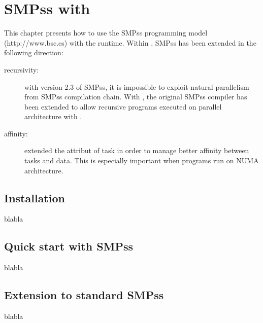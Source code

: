 \chapter{SMPss with \kaapi}
\label{chap:api_smpss}

This chapter presents how to use the SMPss programming model (http://www.bsc.es) with the \kaapi runtime. Within \kaapi, SMPss has been extended in the following direction:
\begin{description}
\item [recursivity:] with version 2.3 of SMPss, it is impossible to exploit natural parallelism from SMPss compilation chain. With \kaapi, the original SMPss compiler has been extended to allow recursive programs executed on parallel architecture with \kaapi. 
\item [affinity:] \kaapi extended the attribut of task in order to manage better affinity between tasks and data. This is especially important when programs run on NUMA architecture.
\end{description}


\section{Installation}
blabla


\section{Quick start with SMPss}
blabla


\section{Extension to standard SMPss}
blabla

